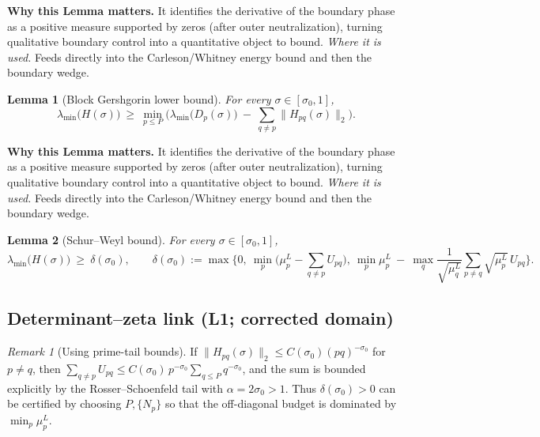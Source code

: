 \documentclass[11pt]{article}
\newtheorem{lemma}{Lemma}[section]
\theoremstyle{definition}
\theoremstyle{remark}
\newtheorem{remark}{Remark}[section]
\begin{document}
  
\vspace{1.0cm}
\noindent\textbf{Why this Lemma matters.} It identifies the derivative of the boundary phase as a positive measure supported by zeros (after outer neutralization), turning qualitative boundary control into a quantitative object to bound.
\noindent\textit{Where it is used.} Feeds directly into the Carleson/Whitney energy bound and then the boundary wedge.
\begin{lemma}[Block Gershgorin lower bound]
\label{lem:block-gersh}
For every $\sigma\in[\sigma_0,1]$,
\[
  \lambda_{\min}\big(H(\sigma)\big)\ \ge\ \min_{p\le P}\Big(\lambda_{\min}\big(D_p(\sigma)\big)\ -\ \sum_{q\ne p}\|H_{pq}(\sigma)\|_2\Big).
\]
\end{lemma}




\vspace{1.0cm}
\noindent\textbf{Why this Lemma matters.} It identifies the derivative of the boundary phase as a positive measure supported by zeros (after outer neutralization), turning qualitative boundary control into a quantitative object to bound.
\noindent\textit{Where it is used.} Feeds directly into the Carleson/Whitney energy bound and then the boundary wedge.
\begin{lemma}[Schur--Weyl bound]
\label{lem:schur-weyl-gap}
For every $\sigma\in[\sigma_0,1]$,
\[
  \lambda_{\min}\big(H(\sigma)\big)\ \ge\ \delta(\sigma_0),\qquad \delta(\sigma_0):=\max\Big\{0,\ \min_p\Big(\mu_p^L-\sum_{q\ne p}U_{pq}\Big),\ \min_p \mu_p^L\ -\ \max_q\frac{1}{\sqrt{\mu_q^L}}\sum_{p\ne q}\sqrt{\mu_p^L}\,U_{pq}\Big\}.\]
\end{lemma}






\vspace{1.0cm}
\subsection*{Determinant--zeta link (L1; corrected domain)}

\begin{remark}[Using prime-tail bounds]
If $\|H_{pq}(\sigma)\|_2\le C(\sigma_0)(pq)^{-\sigma_0}$ for $p\ne q$, then $\sum_{q\ne p}U_{pq}\le C(\sigma_0)\,p^{-\sigma_0}\sum_{q\le P} q^{-\sigma_0}$, and the sum is bounded explicitly by the Rosser--Schoenfeld tail with $\alpha=2\sigma_0>1$. Thus $\delta(\sigma_0)>0$ can be certified by choosing $P,\{N_p\}$ so that the off-diagonal budget is dominated by $\min_p\mu_p^L$.
\end{remark}
\end{document}
